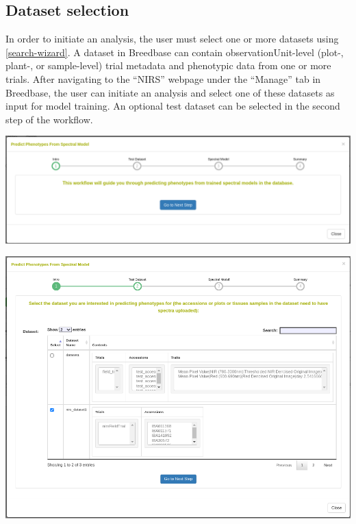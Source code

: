 \documentclass[
  12pt,
]{book}
\begin{document}
\hypertarget{dataset-selection}{%
\subsection{Dataset selection}\label{dataset-selection}}

In order to initiate an analysis, the user must select one or more datasets using \ref{search-wizard}. A dataset in Breedbase can contain observationUnit-level (plot-, plant-, or sample-level) trial metadata and phenotypic data from one or more trials. After navigating to the ``NIRS'' webpage under the ``Manage'' tab in Breedbase, the user can initiate an analysis and select one of these datasets as input for model training. An optional test dataset can be selected in the second step of the workflow.

\begin{center}\includegraphics[width=0.95\linewidth]{assets/images/manage_NIRS_prediction_workflow_intro} \end{center}

\begin{center}\includegraphics[width=0.95\linewidth]{assets/images/manage_NIRS_prediction_workflow_dataset} \end{center}
\end{document}
